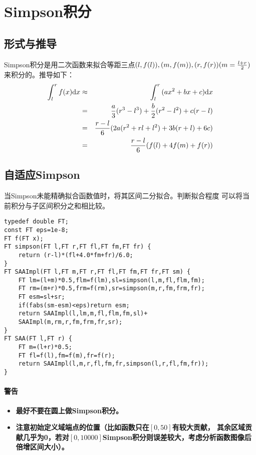 \section{Simpson积分}
\subsection{形式与推导}
Simpson积分是用二次函数来拟合等距三点$(l,f(l)),(m,f(m)),(r,f(r))\\
(m=\frac{l+r}{2})$来积分的。推导如下：
\begin{eqnarray*}
    \int_l^r{f(x)\mathrm{d} x}&\approx&\int_l^r{(ax^2+bx+c)\mathrm{d} x}\\
    &=&\frac{a}{3}(r^3-l^3)+\frac{b}{2}(r^2-l^2)+c(r-l)\\
    &=&\frac{r-l}{6}(2a(r^2+rl+l^2)+3b(r+l)+6c)\\
    &=&\frac{r-l}{6}(f(l)+4f(m)+f(r))
\end{eqnarray*}

\subsection{自适应Simpson}
当Simpson未能精确拟合函数值时，将其区间二分拟合。判断拟合程度
可以将当前积分与子区间积分之和相比较。

\begin{lstlisting}
typedef double FT;
const FT eps=1e-8;
FT f(FT x);
FT simpson(FT l,FT r,FT fl,FT fm,FT fr) {
    return (r-l)*(fl+4.0*fm+fr)/6.0;
}
FT SAAImpl(FT l,FT m,FT r,FT fl,FT fm,FT fr,FT sm) {
    FT lm=(l+m)*0.5,flm=f(lm),sl=simpson(l,m,fl,flm,fm);
    FT rm=(m+r)*0.5,frm=f(rm),sr=simpson(m,r,fm,frm,fr);
    FT esm=sl+sr;
    if(fabs(sm-esm)<eps)return esm;
    return SAAImpl(l,lm,m,fl,flm,fm,sl)+
    SAAImpl(m,rm,r,fm,frm,fr,sr);
}
FT SAA(FT l,FT r) {
    FT m=(l+r)*0.5;
    FT fl=f(l),fm=f(m),fr=f(r);
    return SAAImpl(l,m,r,fl,fm,fr,simpson(l,r,fl,fm,fr));
}
\end{lstlisting}

\paragraph{警告}
\begin{itemize}
    \item {\bfseries 最好不要在圆上做Simpson积分。}
    \item {\bfseries 注意初始定义域端点的位置（比如函数只在$[0,50]$有较大贡献，
其余区域贡献几乎为0，若对$[0,10000]$Simpson积分则误差较大，考虑分析函数图像后
倍增区间大小）。}
\end{itemize}
